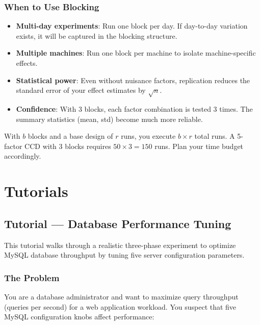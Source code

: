 \documentclass[11pt]{book}
\begin{document}
\section{When to Use Blocking}

\begin{itemize}
  \item \textbf{Multi-day experiments}: Run one block per day. If day-to-day variation exists, it will be captured in the blocking structure.
  \item \textbf{Multiple machines}: Run one block per machine to isolate machine-specific effects.
  \item \textbf{Statistical power}: Even without nuisance factors, replication reduces the standard error of your effect estimates by $\sqrt{n}$.
  \item \textbf{Confidence}: With 3 blocks, each factor combination is tested 3 times. The summary statistics (mean, std) become much more reliable.
\end{itemize}

\begin{keypoint}
With $b$ blocks and a base design of $r$ runs, you execute $b \times r$ total runs. A 5-factor CCD with 3 blocks requires $50 \times 3 = 150$ runs. Plan your time budget accordingly.
\end{keypoint}


\part{Tutorials}

\chapter{Tutorial --- Database Performance Tuning}
\label{ch:tutorial-db}

This tutorial walks through a realistic three-phase experiment to optimize MySQL database throughput by tuning five server configuration parameters.

\section{The Problem}

You are a database administrator and want to maximize query throughput (queries per second) for a web application workload. You suspect that five MySQL configuration knobs affect performance:
\end{document}
